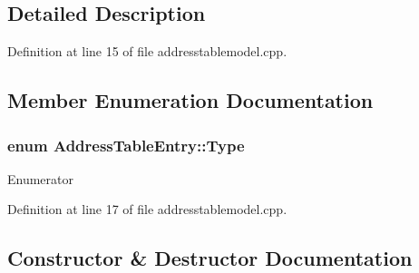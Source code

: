 \subsection{Detailed Description}


Definition at line 15 of file addresstablemodel.\+cpp.



\subsection{Member Enumeration Documentation}
\hypertarget{struct_address_table_entry_afe73719f8e77468e712ed9006f437639}{}
\subsubsection[{Type}]{\setlength{\rightskip}{0pt plus 5cm}enum {\bf Address\+Table\+Entry\+::\+Type}}\label{struct_address_table_entry_afe73719f8e77468e712ed9006f437639}
\begin{Desc}
\item[Enumerator]\par
\begin{description}
\item[{\em 
\hypertarget{struct_address_table_entry_afe73719f8e77468e712ed9006f437639af6c38ef25827387d391de520f32ec7cf}{}Sending\label{struct_address_table_entry_afe73719f8e77468e712ed9006f437639af6c38ef25827387d391de520f32ec7cf}
}]\item[{\em 
\hypertarget{struct_address_table_entry_afe73719f8e77468e712ed9006f437639af74f02d02d0759cfa7a08306c8899a46}{}Receiving\label{struct_address_table_entry_afe73719f8e77468e712ed9006f437639af74f02d02d0759cfa7a08306c8899a46}
}]\end{description}
\end{Desc}


Definition at line 17 of file addresstablemodel.\+cpp.



\subsection{Constructor \& Destructor Documentation}
\hypertarget{struct_address_table_entry_a5eda451b6257f5bb197278da55cf08b2}{}
